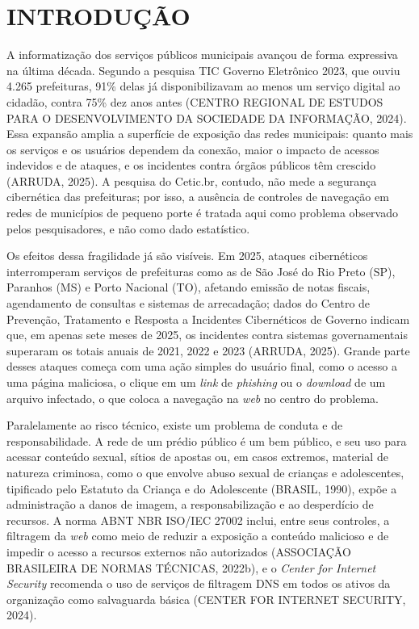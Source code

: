 \documentclass[12pt,a4paper]{article}
\begin{document}
\section{INTRODUÇÃO}
A informatização dos serviços públicos municipais avançou de forma expressiva na última década. Segundo a pesquisa TIC Governo Eletrônico 2023, que ouviu 4.265 prefeituras, 91\% delas já disponibilizavam ao menos um serviço digital ao cidadão, contra 75\% dez anos antes (CENTRO REGIONAL DE ESTUDOS PARA O DESENVOLVIMENTO DA SOCIEDADE DA INFORMAÇÃO, 2024). Essa expansão amplia a superfície de exposição das redes municipais: quanto mais os serviços e os usuários dependem da conexão, maior o impacto de acessos indevidos e de ataques, e os incidentes contra órgãos públicos têm crescido (ARRUDA, 2025). A pesquisa do Cetic.br, contudo, não mede a segurança cibernética das prefeituras; por isso, a ausência de controles de navegação em redes de municípios de pequeno porte é tratada aqui como problema observado pelos pesquisadores, e não como dado estatístico.

Os efeitos dessa fragilidade já são visíveis. Em 2025, ataques cibernéticos interromperam serviços de prefeituras como as de São José do Rio Preto (SP), Paranhos (MS) e Porto Nacional (TO), afetando emissão de notas fiscais, agendamento de consultas e sistemas de arrecadação; dados do Centro de Prevenção, Tratamento e Resposta a Incidentes Cibernéticos de Governo indicam que, em apenas sete meses de 2025, os incidentes contra sistemas governamentais superaram os totais anuais de 2021, 2022 e 2023 (ARRUDA, 2025). Grande parte desses ataques começa com uma ação simples do usuário final, como o acesso a uma página maliciosa, o clique em um \textit{link} de \textit{phishing} ou o \textit{download} de um arquivo infectado, o que coloca a navegação na \textit{web} no centro do problema.

Paralelamente ao risco técnico, existe um problema de conduta e de responsabilidade. A rede de um prédio público é um bem público, e seu uso para acessar conteúdo sexual, sítios de apostas ou, em casos extremos, material de natureza criminosa, como o que envolve abuso sexual de crianças e adolescentes, tipificado pelo Estatuto da Criança e do Adolescente (BRASIL, 1990), expõe a administração a danos de imagem, a responsabilização e ao desperdício de recursos. A norma ABNT NBR ISO/IEC 27002 inclui, entre seus controles, a filtragem da \textit{web} como meio de reduzir a exposição a conteúdo malicioso e de impedir o acesso a recursos externos não autorizados (ASSOCIAÇÃO BRASILEIRA DE NORMAS TÉCNICAS, 2022b), e o \textit{Center for Internet Security} recomenda o uso de serviços de filtragem DNS em todos os ativos da organização como salvaguarda básica (CENTER FOR INTERNET SECURITY, 2024).
\end{document}
